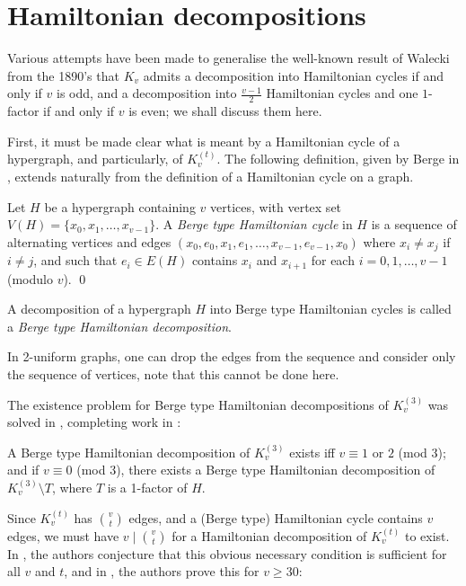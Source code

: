 \section{Hamiltonian decompositions}

Various attempts have been made to generalise the well-known result of Walecki
from the 1890's that $K_v$ admits a decomposition into Hamiltonian cycles if and only if
$v$ is odd, and a decomposition into $\frac{v-1}{2}$ Hamiltonian cycles and one $1$-factor if and
only if $v$ is even; we shall discuss them here.

First, it must be made clear what is meant by a Hamiltonian cycle of a
hypergraph, and particularly, of $K_v^{(t)}$. The following definition,
given by Berge in \cite{berge}, extends naturally from the definition of a
Hamiltonian cycle on a graph.

\begin{definition}
Let $H$ be a hypergraph containing $v$ vertices, with vertex set
$V(H) = \{x_0, x_1, \ldots, x_{v-1}\}$. A {\em Berge type Hamiltonian cycle}
in $H$ is a sequence of alternating vertices and edges $(x_0, e_0, x_1, e_1,
\ldots, x_{v-1}, e_{v-1}, x_0)$ where $x_i \neq x_j$ if $i \neq j$, and such
that $e_i \in E(H)$ contains $x_i$ and $x_{i+1}$ for each $i = 0,1,\ldots,v-1$
(modulo $v$).
\qed
\end{definition}

A decomposition of a hypergraph $H$ into Berge type Hamiltonian cycles is called
a {\em Berge type Hamiltonian decomposition}.

In 2-uniform graphs, one can drop the edges from the sequence and consider only the
sequence of vertices, note that this cannot be done here.

The existence problem for Berge type Hamiltonian decompositions of
$K_{v}^{(3)}$ was solved in \cite{verall}, completing work in \cite{bermond-al}:

\begin{theorem} \label{berge-hamilton}
A Berge type Hamiltonian decomposition of $K_v^{(3)}$ exists iff $v
\equiv 1$ or $2$ (mod $3$); and if $v \equiv 0$ (mod 3), there exists a
Berge type Hamiltonian decomposition of $K_v^{(3)} \setminus T$, where $T$ is a
1-factor of $H$.
\end{theorem}

Since $K_v^{(t)}$ has $v \choose t$ edges, and a (Berge type) Hamiltonian cycle
contains $v$ edges, we must have $v \mid {v \choose t}$ for a Hamiltonian
decomposition of $K_v^{(t)}$ to exist. In \cite{bermond}, the authors conjecture
that this obvious necessary condition is sufficient for all $v$ and $t$, and in
\cite{kuhn-osthus}, the authors prove this for $v \geq 30$:

